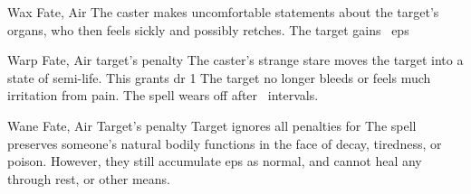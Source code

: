 \ifodd\value{diceNo}
  {}%
  {Wax}%
  {Fate, Air}%
  {}%
  {The caster makes uncomfortable statements about the target's organs, who then feels sickly and possibly retches.
  The target gains ~\glspl{ep}}%
  {}

\else

  {}%
  {Warp}%
  {Fate, Air}%
  {target's  penalty}%
  {The caster's strange stare moves the target into a state of semi-life.
  This grants \gls{dr} 1}%
  {
    The target no longer bleeds or feels much irritation from pain.%
    The spell wears off after ~\glspl{interval}.}

  {}%
  {Wane}%
  {Fate, Air}%
  {Target's  penalty}%
  {Target ignores all  penalties for }%
  {The spell preserves someone's natural bodily functions in the face of decay, tiredness, or poison.
    However, they still accumulate \glspl{ep} as normal, and cannot heal any through rest, or other means.}

\fi
{}
